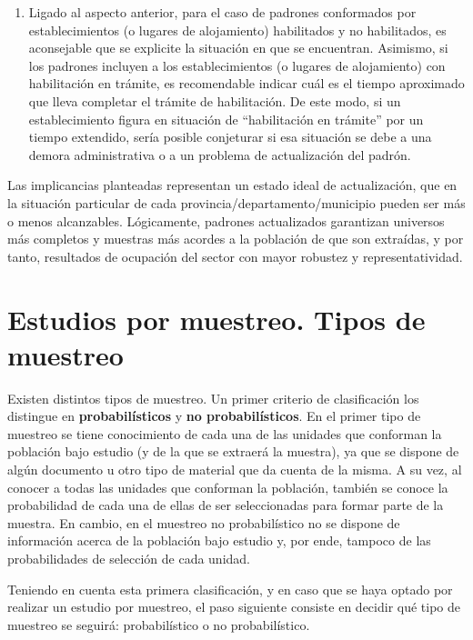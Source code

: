 \documentclass[
]{book}
\begin{document}
\begin{enumerate}
\item
  Ligado al aspecto anterior, para el caso de padrones conformados por establecimientos (o lugares de alojamiento) habilitados y no habilitados, es aconsejable que se explicite la situación en que se encuentran. Asimismo, si los padrones incluyen a los establecimientos (o lugares de alojamiento) con habilitación en trámite, es recomendable indicar cuál es el tiempo aproximado que lleva completar el trámite de habilitación. De este modo, si un establecimiento figura en situación de ``habilitación en trámite'' por un tiempo extendido, sería posible conjeturar si esa situación se debe a una demora administrativa o a un problema de actualización del padrón.
\end{enumerate}

Las implicancias planteadas representan un estado ideal de actualización, que en la situación particular de cada provincia/departamento/municipio pueden ser más o menos alcanzables. Lógicamente, padrones actualizados garantizan universos más completos y muestras más acordes a la población de que son extraídas, y por tanto, resultados de ocupación del sector con mayor robustez y representatividad.

\hypertarget{estudios-por-muestreo.-tipos-de-muestreo}{%
\section{Estudios por muestreo. Tipos de muestreo}\label{estudios-por-muestreo.-tipos-de-muestreo}}

Existen distintos tipos de muestreo. Un primer criterio de clasificación los distingue en \textbf{probabilísticos} y \textbf{no probabilísticos}. En el primer tipo de muestreo se tiene conocimiento de cada una de las unidades que conforman la población bajo estudio (y de la que se extraerá la muestra), ya que se dispone de algún documento u otro tipo de material que da cuenta de la misma. A su vez, al conocer a todas las unidades que conforman la población, también se conoce la probabilidad de cada una de ellas de ser seleccionadas para formar parte de la muestra. En cambio, en el muestreo no probabilístico no se dispone de información acerca de la población bajo estudio y, por ende, tampoco de las probabilidades de selección de cada unidad.

Teniendo en cuenta esta primera clasificación, y en caso que se haya optado por realizar un estudio por muestreo, el paso siguiente consiste en decidir qué tipo de muestreo se seguirá: probabilístico o no probabilístico.
\end{document}
